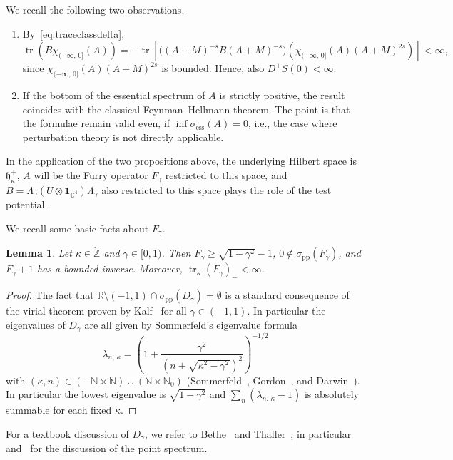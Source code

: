 \documentclass[10pt]{amsart}
\newtheorem{lemm}[cdrthm]{Lemma}
\theoremstyle{definition}
\DeclareMathOperator{\tr}{tr}
\newcommand{\ess}{\mathrm{ess}}
\newcommand{\pp}{\mathrm{pp}}
\newcommand*\cz{\mathbb{C}}
\newcommand*\nz{\mathbb{N}}
\newcommand*\gz{\mathbb{Z}}
\newcommand*\rz{\mathbb{R}}
\newcommand*\zp{\dot{\gz}}
\newcommand{\one}{\mathbf{1}}
\newcommand*\gh{\mathfrak{h}}
\newcommand*\ghpk{{\gh^+_\kappa}}
\begin{document}
We recall the following two observations.
\begin{enumerate}
\item By~\eqref{eq:traceclassdelta},
\[
\tr\left(B\chi_{(-\infty,\,0]}(A)\right)=-\tr\left[\big((A+M)^{-s}B(A+M)^{-s}\big)\left(\chi_{(-\infty,\,0]}(A)(A+M)^{2s}\right)\right]<\infty,
\]
since $\chi_{(-\infty,\,0]}(A)(A+M)^{2s}$ is bounded. Hence, also $D^+S(0)<\infty$.

\item If the bottom of the essential spectrum of $A$ is strictly positive, the result coincides with the classical Feynman--Hellmann theorem. The point is that the formulae remain valid even, if $\inf\sigma_{\ess}(A)=0$, i.e., the case where perturbation theory is not directly applicable.
\end{enumerate}
In the application of the two propositions above, the underlying Hilbert space is $\ghpk$, $A$ will be the Furry operator $F_{\gamma}$ restricted to this space, and $B = \Lambda_\gamma(U\otimes\one_{\cz^4})\Lambda_\gamma$ also restricted to this space plays the role of the test potential.

We recall some basic facts about $F_\gamma$.
\begin{lemm}\label{hydrogen}
Let $\kappa\in\zp$ and $\gamma\in[0,1)$. Then $F_\gamma\geq\sqrt{1-\gamma^2}-1$, $0\notin\sigma_\pp(F_\gamma)$, and $F_\gamma+1$ has a bounded inverse. Moreover, $\tr_\kappa (F_\gamma)_-<\infty$.
\end{lemm}


\begin{proof}
The fact that $\rz\setminus(-1,1)\cap \sigma_\pp(D_\gamma)=\emptyset$ is a standard consequence of the virial theorem proven by Kalf~\cite{Kalf1976} for all $\gamma\in(-1,1)$. In particular the eigenvalues of $D_\gamma$ are all given by Sommerfeld's eigenvalue formula
\begin{equation}\label{eq:eigenvalue}
\lambda_{n,\,\kappa} = \left(1+\frac{\gamma^2}{\left(n+\sqrt{\kappa^2-\gamma^2}\right)^2}\right)^{-1/2}
\end{equation}
with $(\kappa,n)\in(-\nz\times\nz)\cup(\nz\times\nz_0)$ (Sommerfeld~\cite{Sommerfeld1916}, Gordon~\cite{Gordon1928}, and Darwin~\cite{Darwin1928}). In particular the lowest eigenvalue is $\sqrt{1-\gamma^2}$ and $\sum_{n}(\lambda_{n,\,\kappa}-1)$ is absolutely summable for each fixed $\kappa$.
\end{proof}

For a textbook discussion of $D_\gamma$, we refer to Bethe~\cite{Bethe1933} and Thaller~\cite{Thaller1992}, in particular~\cite[p.~314f]{Bethe1933} and~\cite[Sections~7.4.2 and~7.4.5]{Thaller1992} for the discussion of the point spectrum.
\end{document}
